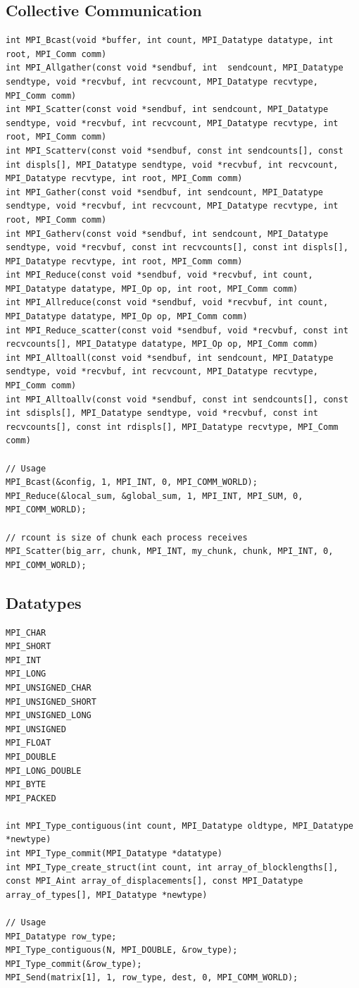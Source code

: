 \documentclass{article}
\begin{document}
\subsection{Collective Communication}
\begin{lstlisting}
int MPI_Bcast(void *buffer, int count, MPI_Datatype datatype, int root, MPI_Comm comm)
int MPI_Allgather(const void *sendbuf, int  sendcount, MPI_Datatype sendtype, void *recvbuf, int recvcount, MPI_Datatype recvtype, MPI_Comm comm)
int MPI_Scatter(const void *sendbuf, int sendcount, MPI_Datatype sendtype, void *recvbuf, int recvcount, MPI_Datatype recvtype, int root, MPI_Comm comm)
int MPI_Scatterv(const void *sendbuf, const int sendcounts[], const int displs[], MPI_Datatype sendtype, void *recvbuf, int recvcount, MPI_Datatype recvtype, int root, MPI_Comm comm)
int MPI_Gather(const void *sendbuf, int sendcount, MPI_Datatype sendtype, void *recvbuf, int recvcount, MPI_Datatype recvtype, int root, MPI_Comm comm)
int MPI_Gatherv(const void *sendbuf, int sendcount, MPI_Datatype sendtype, void *recvbuf, const int recvcounts[], const int displs[], MPI_Datatype recvtype, int root, MPI_Comm comm)
int MPI_Reduce(const void *sendbuf, void *recvbuf, int count, MPI_Datatype datatype, MPI_Op op, int root, MPI_Comm comm)
int MPI_Allreduce(const void *sendbuf, void *recvbuf, int count, MPI_Datatype datatype, MPI_Op op, MPI_Comm comm)
int MPI_Reduce_scatter(const void *sendbuf, void *recvbuf, const int recvcounts[], MPI_Datatype datatype, MPI_Op op, MPI_Comm comm)
int MPI_Alltoall(const void *sendbuf, int sendcount, MPI_Datatype sendtype, void *recvbuf, int recvcount, MPI_Datatype recvtype, MPI_Comm comm)
int MPI_Alltoallv(const void *sendbuf, const int sendcounts[], const int sdispls[], MPI_Datatype sendtype, void *recvbuf, const int recvcounts[], const int rdispls[], MPI_Datatype recvtype, MPI_Comm comm)

// Usage
MPI_Bcast(&config, 1, MPI_INT, 0, MPI_COMM_WORLD);
MPI_Reduce(&local_sum, &global_sum, 1, MPI_INT, MPI_SUM, 0, MPI_COMM_WORLD);

// rcount is size of chunk each process receives
MPI_Scatter(big_arr, chunk, MPI_INT, my_chunk, chunk, MPI_INT, 0, MPI_COMM_WORLD);
\end{lstlisting}

\subsection{Datatypes}
\begin{lstlisting}
MPI_CHAR
MPI_SHORT
MPI_INT
MPI_LONG
MPI_UNSIGNED_CHAR
MPI_UNSIGNED_SHORT
MPI_UNSIGNED_LONG
MPI_UNSIGNED
MPI_FLOAT
MPI_DOUBLE
MPI_LONG_DOUBLE
MPI_BYTE
MPI_PACKED

int MPI_Type_contiguous(int count, MPI_Datatype oldtype, MPI_Datatype *newtype)
int MPI_Type_commit(MPI_Datatype *datatype)
int MPI_Type_create_struct(int count, int array_of_blocklengths[], const MPI_Aint array_of_displacements[], const MPI_Datatype array_of_types[], MPI_Datatype *newtype)

// Usage
MPI_Datatype row_type;
MPI_Type_contiguous(N, MPI_DOUBLE, &row_type);
MPI_Type_commit(&row_type);
MPI_Send(matrix[1], 1, row_type, dest, 0, MPI_COMM_WORLD);
\end{lstlisting}
\end{document}
